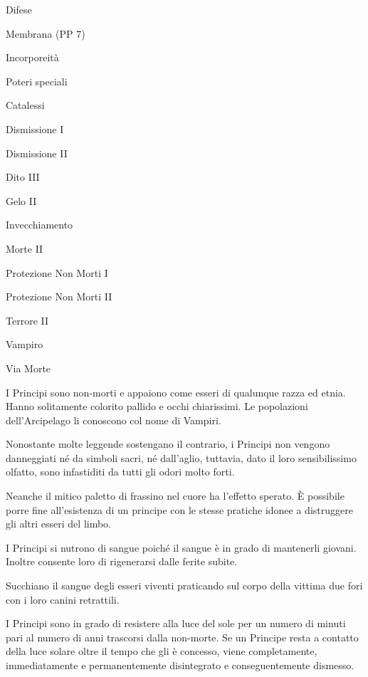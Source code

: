\begin{parmostro}{Difese}
\item Membrana (PP 7) 
\item Incorporeit\`a
\end{parmostro}

\begin{parmostro}{Poteri speciali}
\item Catalessi
\item Dismissione I
\item Dismissione II
\item Dito III 
\item Gelo II
\item Invecchiamento
\item Morte II
\item Protezione Non Morti I
\item Protezione Non Morti II
\item Terrore II
\item Vampiro
\item Via Morte
\end{parmostro}



I Principi sono non-morti e appaiono come esseri di qualunque razza ed
etnia. Hanno solitamente colorito pallido e occhi chiarissimi. Le
popolazioni dell'Arcipelago li conoscono col nome di Vampiri.

Nonostante molte leggende sostengano il contrario, i Principi non
vengono danneggiati n\'e da simboli sacri, n\'e dall'aglio,
tuttavia, dato il loro sensibilissimo olfatto, sono infastiditi da
tutti gli odori molto forti. 

Neanche il mitico paletto di frassino nel cuore ha l'effetto sperato.
\`E possibile porre fine all'esistenza di un principe con le stesse
pratiche idonee a distruggere gli altri esseri del limbo.

I Principi si nutrono di sangue poich\'e il sangue \`e in grado di
mantenerli giovani. Inoltre consente loro di rigenerarsi dalle ferite
subite.  

Succhiano il sangue degli esseri viventi praticando sul corpo
della vittima due fori con i loro canini retrattili.  

I Principi sono in grado di resistere alla luce del sole per un numero
di minuti pari al numero di anni trascorsi dalla non-morte. Se un
Principe resta a contatto della luce solare oltre il tempo che gli
\`e concesso, viene completamente, immediatamente e permanentemente
disintegrato e conseguentemente dismesso. 

